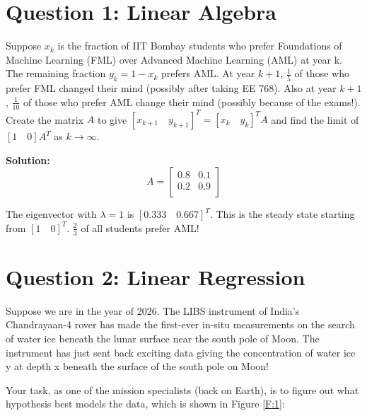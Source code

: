 \documentclass[12pt]{article}
\begin{document}
	\MakeScribeTop
	
	
	\section*{Question 1: Linear Algebra \cite{q1}}
	Suppose $x_k$ is the fraction of IIT Bombay students who prefer Foundations of Machine Learning (FML) over Advanced Machine Learning (AML) at year k. The remaining fraction $y_k = 1-x_k$ prefers AML. At year $k+1$, $\frac{1}{5}$ of those who prefer FML changed their mind (possibly after taking EE 768). Also at year $k+1$, $\frac{1}{10}$ of those who prefer AML change their mind (possibly because of the exams!). Create the matrix $A$ to give $[x_{k+1} \quad y_{k+1}]^T = [x_k \quad y_k]^TA$ and find the limit of $[1 \quad 0]A^T$ as $k \rightarrow \infty$.
	
	\begin{framed}
		\textbf{Solution:}
		\begin{equation}
			A = \begin{bmatrix}
				0.8 & 0.1 \\
				0.2 & 0.9 \\
			\end{bmatrix}
		\end{equation}
		
		The eigenvector with $\lambda = 1$ is $[0.333 \quad 0.667]^T$. This is the steady state starting from $[1 \quad 0]^T$. $\frac{2}{3}$ of all students prefer AML!
	\end{framed}
	
	\section*{Question 2: Linear Regression \cite{q2}}
	Suppose we are in the year of 2026. The LIBS instrument of India's Chandrayaan-4 rover has made the first-ever in-situ measurements on the search of water ice beneath the lunar surface near the south pole of Moon. The instrument has just sent back exciting data giving the concentration of water ice y at depth x beneath the surface of the south pole on Moon!

	Your task, as one of the mission specialists (back on Earth), is to figure out what hypothesis best models the data, which is shown in Figure \ref{F:1}:
\end{document}
